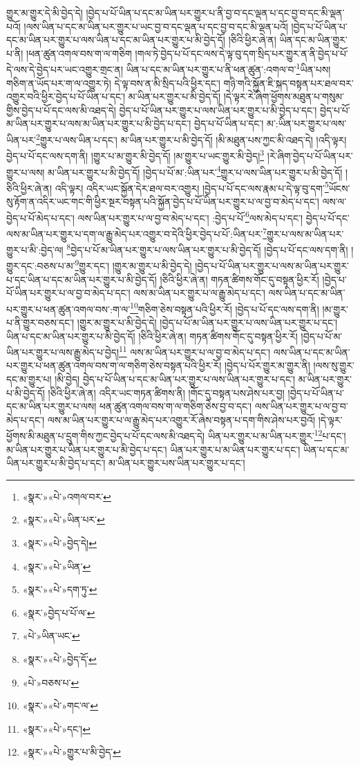 གྱུར་མ་གྱུར་དེ་མི་བྱེད་དེ། །བྱེད་པ་པོ་ཡིན་པ་དང་མ་ཡིན་པར་གྱུར་པ་ནི་བྱ་བ་དང་ལྡན་པ་དང་བྱ་བ་དང་མི་ལྡན་པའོ། །ལས་ཡིན་པ་དང་མ་ཡིན་པར་གྱུར་པ་ཡང་བྱ་བ་དང་ལྡན་པ་དང་བྱ་བ་དང་མི་ལྡན་པའོ། །བྱེད་པ་པོ་ཡིན་པ་དང་མ་ཡིན་པར་གྱུར་པ་ལས་ཡིན་པ་དང་མ་ཡིན་པར་གྱུར་པ་མི་བྱེད་དོ། །ཅིའི་ཕྱིར་ཞེ་ན། ཡིན་དང་མ་ཡིན་གྱུར་པ་ནི། །ཕན་ཚུན་འགལ་བས་ག་ལ་གཅིག །གལ་ཏེ་བྱེད་པ་པོ་དང་ལས་དེ་ལྟ་བུ་དག་སྲིད་པར་གྱུར་ན་ནི་བྱེད་པ་པོ་དེ་ལས་དེ་བྱེད་པར་ཡང་འགྱུར་གྲང་ན། ཡིན་པ་དང་མ་ཡིན་པར་གྱུར་པ་ནི་ཕན་ཚུན་:འགལ་བ་\footnote{«སྣར་»«པེ་»འགལ་བར་}ཡིན་པས། གཅིག་ན་ཡོད་པར་ག་ལ་འགྱུར་ཏེ། དེ་ལྟ་བས་ན་མི་སྲིད་པའི་ཕྱིར་དང་། གཉི་གའི་སྐྱོན་ཇི་སྐད་བསྟན་པར་ཐལ་བར་འགྱུར་བའི་ཕྱིར་བྱེད་པ་པོ་ཡིན་པ་དང་། མ་ཡིན་པར་གྱུར་པ་མི་བྱེད་དོ། །དེ་ལྟར་རེ་ཞིག་ཕྱོགས་མཐུན་པ་གསུམ་གྱིས་བྱེད་པ་པོ་དང་ལས་མི་འཐད་དེ། བྱེད་པ་པོ་ཡིན་པར་གྱུར་པ་ལས་ཡིན་པར་གྱུར་པ་མི་བྱེད་པ་དང་། བྱེད་པ་པོ་མ་ཡིན་པར་གྱུར་པ་ལས་མ་ཡིན་པར་གྱུར་པ་མི་བྱེད་པ་དང་། བྱེད་པ་པོ་ཡིན་པ་དང་། མ་:ཡིན་པར་གྱུར་པ་ལས་ཡིན་པར་\footnote{«སྣར་»«པེ་»ཡིན་པར་}གྱུར་པ་ལས་ཡིན་པ་དང་། མ་ཡིན་པར་གྱུར་པ་མི་བྱེད་དོ། །མི་མཐུན་པས་ཀྱང་མི་འཐད་དེ། །འདི་ལྟར། བྱེད་པ་པོ་དང་ལས་དག་ནི། །གྱུར་པ་མ་གྱུར་མི་བྱེད་དོ། །མ་གྱུར་པ་ཡང་གྱུར་མི་བྱེད།\footnote{«སྣར་»«པེ་»བྱེད་དེ།} །རེ་ཞིག་བྱེད་པ་པོ་ཡིན་པར་གྱུར་པ་ལས། མ་ཡིན་པར་གྱུར་པ་མི་བྱེད་དོ། །བྱེད་པ་པོ་མ་:ཡིན་པར་\footnote{«སྣར་»«པེ་»ཡིན་}གྱུར་པ་ལས་ཡིན་པར་གྱུར་པ་མི་བྱེད་དོ། །ཅིའི་ཕྱིར་ཞེ་ན། འདི་ལྟར། འདིར་ཡང་སྐྱོན་དེར་ཐལ་བར་འགྱུར། །བྱེད་པ་པོ་དང་ལས་རྣམ་པ་དེ་ལྟ་བུ་དག་\footnote{«སྣར་»«པེ་»དག་ཏུ་}ཡོངས་སུ་རྟོག་ན་འདིར་ཡང་གང་གི་ཕྱིར་སྔར་བསྟན་པའི་སྐྱོན་བྱེད་པ་པོ་ཡིན་པར་གྱུར་པ་ལ་བྱ་བ་མེད་པ་དང་། ལས་ལ་བྱེད་པ་པོ་མེད་པ་དང་། ལས་ཡིན་པར་གྱུར་པ་ལ་བྱ་བ་མེད་པ་དང་། :བྱེད་པ་པོ་\footnote{«སྣར་»བྱེད་པ་པོ་ལ་}ལས་མེད་པ་དང་། བྱེད་པ་པོ་དང་ལས་མ་ཡིན་པར་གྱུར་པ་དག་ལ་རྒྱུ་མེད་པར་འགྱུར་བ་དེའི་ཕྱིར་བྱེད་པ་པོ་:ཡིན་པར་\footnote{«པེ་»ཡིན་ཡང་}གྱུར་པ་ལས་མ་ཡིན་པར་གྱུར་པ་མི་:བྱེད་ལ། \footnote{«སྣར་»«པེ་»བྱེད་དོ་}བྱེད་པ་པོ་མ་ཡིན་པར་གྱུར་པ་ལས་ཡིན་པར་གྱུར་པ་མི་བྱེད་དོ། །བྱེད་པ་པོ་དང་ལས་དག་ནི། །གྱུར་དང་:བཅས་པ་མ་\footnote{«པེ་»བཅས་པ་}གྱུར་དང་། །གྱུར་མ་གྱུར་པ་མི་བྱེད་དེ། །བྱེད་པ་པོ་ཡིན་པར་གྱུར་པ་ལས་མ་ཡིན་པར་གྱུར་པ་དང་ཡིན་པ་དང་མ་ཡིན་པར་གྱུར་པ་མི་བྱེད་དོ། །ཅིའི་ཕྱིར་ཞེ་ན། གཏན་ཚིགས་གོང་དུ་བསྟན་ཕྱིར་རོ། །བྱེད་པ་པོ་ཡིན་པར་གྱུར་པ་ལ་བྱ་བ་མེད་པ་དང་། ལས་མ་ཡིན་པར་གྱུར་པ་ལ་རྒྱུ་མེད་པ་དང་། ལས་ཡིན་པ་དང་མ་ཡིན་པར་གྱུར་པ་ཕན་ཚུན་འགལ་བས་:ག་ལ་\footnote{«སྣར་»«པེ་»གང་ལ་}གཅིག་ཅེས་བསྟན་པའི་ཕྱིར་རོ། །བྱེད་པ་པོ་དང་ལས་དག་ནི། །མ་གྱུར་པ་ནི་གྱུར་བཅས་དང་། །གྱུར་མ་གྱུར་པ་མི་བྱེད་དེ། །བྱེད་པ་པོ་མ་ཡིན་པར་གྱུར་པ་ལས་ཡིན་པར་གྱུར་པ་དང་། ཡིན་པ་དང་མ་ཡིན་པར་གྱུར་པ་མི་བྱེད་དོ། །ཅིའི་ཕྱིར་ཞེ་ན། གཏན་ཚིགས་གོང་དུ་བསྟན་ཕྱིར་རོ། །བྱེད་པ་པོ་མ་ཡིན་པར་གྱུར་པ་ལས་རྒྱུ་མེད་པ་བྱེད།\footnote{«སྣར་»«པེ་»དང་།} ལས་མ་ཡིན་པར་གྱུར་པ་ལ་བྱ་བ་མེད་པ་དང་། ལས་ཡིན་པ་དང་མ་ཡིན་པར་གྱུར་པ་ཕན་ཚུན་འགལ་བས་ག་ལ་གཅིག་ཅེས་བསྟན་པའི་ཕྱིར་རོ། །བྱེད་པ་པོར་གྱུར་མ་གྱུར་ནི། །ལས་སུ་གྱུར་དང་མ་གྱུར་པ། །མི་བྱེད། བྱེད་པ་པོ་ཡིན་པ་དང་མ་ཡིན་པར་གྱུར་པ་ལས་ཡིན་པར་གྱུར་པ་དང་། མ་ཡིན་པར་གྱུར་པ་མི་བྱེད་དོ། །ཅིའི་ཕྱིར་ཞེ་ན། འདིར་ཡང་གཏན་ཚིགས་ནི། །གོང་དུ་བསྟན་པས་ཤེས་པར་བྱ། །བྱེད་པ་པོ་ཡིན་པ་དང་མ་ཡིན་པར་གྱུར་པ་ལས། ཕན་ཚུན་འགལ་བས་ག་ལ་གཅིག་ཅེས་བྱ་བ་དང་། ལས་ཡིན་པར་གྱུར་པ་ལ་བྱ་བ་མེད་པ་དང་། ལས་མ་ཡིན་པར་གྱུར་པ་ལ་རྒྱུ་མེད་པར་འགྱུར་རོ་ཞེས་བསྟན་པ་དག་གིས་ཤེས་པར་བྱའོ། །དེ་ལྟར་ཕྱོགས་མི་མཐུན་པ་དྲུག་གིས་ཀྱང་བྱེད་པ་པོ་དང་ལས་མི་འཐད་དེ། ཡིན་པར་གྱུར་པ་མ་ཡིན་པར་གྱུར་\footnote{«སྣར་»«པེ་»གྱུར་པ་མི་བྱེད་}པ་དང་། མ་ཡིན་པར་གྱུར་པ་ཡིན་པར་གྱུར་པ་མི་བྱེད་པ་དང་། ཡིན་པར་གྱུར་པ་མ་ཡིན་པར་གྱུར་པ་དང་། ཡིན་པ་དང་མ་ཡིན་པར་གྱུར་པ་མི་བྱེད་པ་དང་། མ་ཡིན་པར་གྱུར་པས་ཡིན་པར་གྱུར་པ་དང་། 